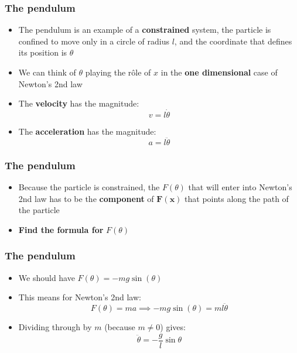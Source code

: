\documentclass{beamer}
\begin{document}
\begin{frame}
  \frametitle{The pendulum}
  \begin{itemize}
    \item<1-> The pendulum is an example of a \textbf{constrained} system, the particle is confined to move only in a circle of radius $l$, and the coordinate that defines its position is $\theta$
    \item<2-> We can think of $\theta$ playing the r\^ole of $x$ in the \textbf{one dimensional} case of Newton's 2nd law
    \item<3-> The \textbf{velocity} has the magnitude:
      \begin{equation*}
	v=l\dot{\theta}
      \end{equation*}
    \item<4-> The \textbf{acceleration} has the magnitude:
      \begin{equation*}
	a=l\ddot{\theta}
      \end{equation*}
  \end{itemize}
\end{frame}

\begin{frame}
  \frametitle{The pendulum}
  \begin{itemize}
    \item<1-> Because the particle is constrained, the $F(\theta)$ that will enter into Newton's 2nd law has to be the \textbf{component} of $\mathbf{F}(\mathbf{x})$ that points along the path of the particle
    \item<2-> \textbf{Find the formula for} $F(\theta)$
  \end{itemize}
\end{frame}

\begin{frame}
  \frametitle{The pendulum}
  \begin{itemize}
    \item<1-> We should have $F(\theta)=-mg\sin(\theta)$
    \item<2-> This means for Newton's 2nd law:
      \begin{equation*}
	F(\theta)=ma\implies -mg\sin(\theta)=ml\ddot{\theta}
      \end{equation*}
    \item<3-> Dividing through by $m$ (because $m\neq 0$) gives:
      \begin{equation*}
	\ddot{\theta}=-\frac{g}{l}\sin{\theta}
      \end{equation*}
  \end{itemize}
\end{frame}
\end{document}
